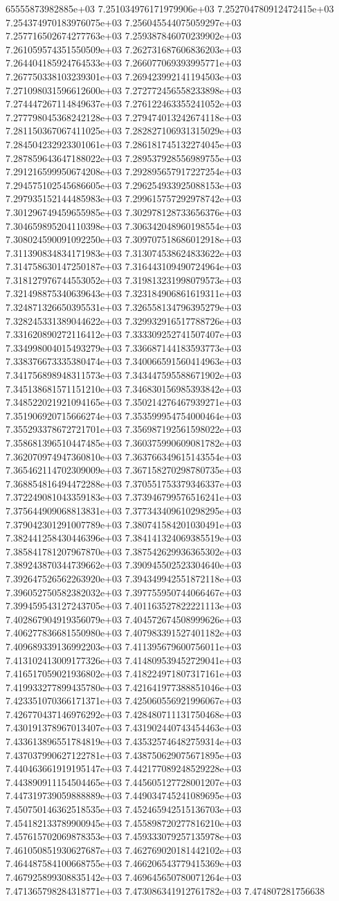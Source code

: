 65555873982885e+03	7.251034976171979906e+03	7.252704780912472415e+03	7.254374970183976075e+03	7.256045544075059297e+03	7.257716502674277763e+03	7.259387846070239902e+03	7.261059574351550509e+03	7.262731687606836203e+03	7.264404185924764533e+03	7.266077069393995771e+03	7.267750338103239301e+03	7.269423992141194503e+03	7.271098031596612600e+03	7.272772456558233898e+03	7.274447267114849637e+03	7.276122463355241052e+03	7.277798045368242128e+03	7.279474013242674118e+03	7.281150367067411025e+03	7.282827106931315029e+03	7.284504232923301061e+03	7.286181745132274045e+03	7.287859643647188022e+03	7.289537928556989755e+03	7.291216599950674208e+03	7.292895657917227254e+03	7.294575102545686605e+03	7.296254933925088153e+03	7.297935152144485983e+03	7.299615757292978742e+03	7.301296749459655985e+03	7.302978128733656376e+03	7.304659895204110398e+03	7.306342048960198554e+03	7.308024590091092250e+03	7.309707518686012918e+03	7.311390834834171983e+03	7.313074538624833622e+03	7.314758630147250187e+03	7.316443109490724964e+03	7.318127976744553052e+03	7.319813231998079573e+03	7.321498875340639643e+03	7.323184906861619311e+03	7.324871326650395531e+03	7.326558134796395279e+03	7.328245331389044622e+03	7.329932916517788726e+03	7.331620890272116412e+03	7.333309252741507407e+03	7.334998004015493279e+03	7.336687144183593773e+03	7.338376673335380474e+03	7.340066591560414963e+03	7.341756898948311573e+03	7.343447595588671902e+03	7.345138681571151210e+03	7.346830156985393842e+03	7.348522021921094165e+03	7.350214276467939271e+03	7.351906920715666274e+03	7.353599954754000464e+03	7.355293378672721701e+03	7.356987192561598022e+03	7.358681396510447485e+03	7.360375990609081782e+03	7.362070974947360810e+03	7.363766349615143554e+03	7.365462114702309009e+03	7.367158270298780735e+03	7.368854816494472288e+03	7.370551753379346337e+03	7.372249081043359183e+03	7.373946799576516241e+03	7.375644909068813831e+03	7.377343409610298295e+03	7.379042301291007789e+03	7.380741584201030491e+03	7.382441258430446396e+03	7.384141324069385519e+03	7.385841781207967870e+03	7.387542629936365302e+03	7.389243870344739662e+03	7.390945502523304640e+03	7.392647526562263920e+03	7.394349942551872118e+03	7.396052750582382032e+03	7.397755950744066467e+03	7.399459543127243705e+03	7.401163527822221113e+03	7.402867904919356079e+03	7.404572674508999626e+03	7.406277836681550980e+03	7.407983391527401182e+03	7.409689339136992203e+03	7.411395679600756011e+03	7.413102413009177326e+03	7.414809539452729041e+03	7.416517059021936802e+03	7.418224971807317161e+03	7.419933277899435780e+03	7.421641977388851046e+03	7.423351070366171371e+03	7.425060556921996067e+03	7.426770437146976292e+03	7.428480711131750468e+03	7.430191378967013407e+03	7.431902440743454463e+03	7.433613896551784819e+03	7.435325746482759314e+03	7.437037990627122781e+03	7.438750629075671895e+03	7.440463661919195147e+03	7.442177089248529228e+03	7.443890911154504465e+03	7.445605127728001207e+03	7.447319739059888889e+03	7.449034745241089695e+03	7.450750146362518535e+03	7.452465942515136703e+03	7.454182133789900945e+03	7.455898720277816210e+03	7.457615702069878353e+03	7.459333079257135978e+03	7.461050851930627687e+03	7.462769020181442102e+03	7.464487584100668755e+03	7.466206543779415369e+03	7.467925899308835142e+03	7.469645650780071264e+03	7.471365798284318771e+03	7.473086341912761782e+03	7.474807281756638